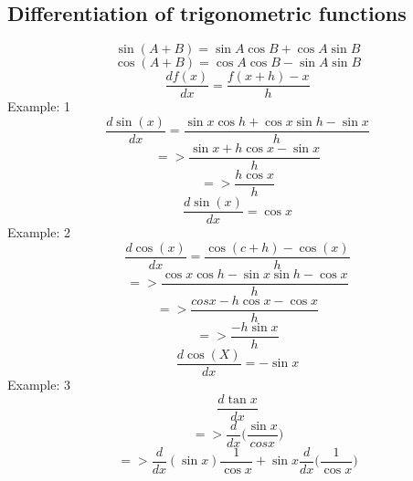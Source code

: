 \subsection{Differentiation of trigonometric functions}
\begin{equation}
\sin(A+B) = \sin A\cos B+\cos A\sin B
\end{equation}
\begin{equation}
\cos(A+B) = \cos A\cos B - \sin A\sin B
\end{equation}
\begin{equation}
\frac{df(x)}{dx} = \frac{f(x+h)-x}{h}
\end{equation}
\newline
Example: 1
\begin{displaymath}
\frac{d\sin(x)}{dx} = \frac{\sin x \cos h+\cos x\sin h-\sin x}{h}
\end{displaymath}
\begin{displaymath}
=> \frac{\sin x + h\cos x - \sin x}{h}
\end{displaymath}
\begin{displaymath}
=>\frac{h\cos x}{h}
\end{displaymath}
\begin{equation}
\frac{d\sin(x)}{dx} = \cos x
\end{equation}
\newline
Example: 2
\begin{displaymath}
\frac{d\cos(x)}{dx} = \frac{\cos(c+h)-\cos (x)}{h}
\end{displaymath}
\begin{displaymath}
=> \frac{\cos x \cos h-\sin x \sin h - \cos x}{h}
\end{displaymath}
\begin{displaymath}
=> \frac{cos x- h \cos x - \cos x}{h}
\end{displaymath}
\begin{displaymath}
=> \frac{-h\sin x}{h}
\end{displaymath}
\begin{equation}
\frac{d\cos (X)}{dx} = -\sin x
\end{equation}
\newline
Example: 3
\begin{displaymath}
\frac{d\tan x}{dx}
\end{displaymath}
\begin{displaymath}
=>\frac{d}{dx}\bigg(\frac{\sin x}{cos x}\bigg)
\end{displaymath}
\begin{displaymath}
=>\frac{d}{dx}(\sin x)\frac{1}{\cos x}+\sin x \frac{d}{dx}\bigg(\frac{1}{\cos x}\bigg)
\end{displaymath}
